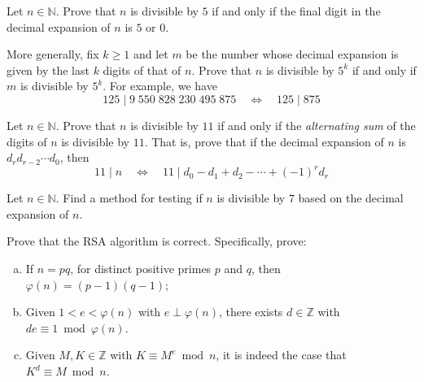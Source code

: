 \begin{exercise}
Let $n \in \mathbb{N}$. Prove that $n$ is divisible by $5$ if and only if the final digit in the decimal expansion of $n$ is $5$ or $0$.

More generally, fix $k \ge 1$ and let $m$ be the number whose decimal expansion is given by the last $k$ digits of that of $n$. Prove that $n$ is divisible by $5^k$ if and only if $m$ is divisible by $5^k$. For example, we have
\[ 125 \mid 9\;550\;828\;230\;495\;875 \quad \Leftrightarrow \quad 125 \mid 875 \]
\end{exercise}

\begin{exercise}
Let $n \in \mathbb{N}$. Prove that $n$ is divisible by $11$ if and only if the \textit{alternating sum} of the digits of $n$ is divisible by $11$. That is, prove that if the decimal expansion of $n$ is $d_rd_{r-2} \cdots d_0$, then
\[ 11 \mid n \quad \Leftrightarrow \quad 11 \mid d_0 - d_1 + d_2 - \cdots + (-1)^rd_r \]
\end{exercise}

\begin{exercise}
Let $n \in \mathbb{N}$. Find a method for testing if $n$ is divisible by $7$ based on the decimal expansion of $n$.
\end{exercise}


\begin{exercise}
Prove that the RSA algorithm is correct. Specifically, prove:
\begin{enumerate}[(a)]
\item If $n=pq$, for distinct positive primes $p$ and $q$, then $\varphi(n) = (p-1)(q-1)$;
\item Given $1<e<\varphi(n)$ with $e \perp \varphi(n)$, there exists $d \in \mathbb{Z}$ with $de \equiv 1 \bmod \varphi(n)$.
\item Given $M,K \in \mathbb{Z}$ with $K \equiv M^e \bmod n$, it is indeed the case that $K^d \equiv M \bmod n$.
\end{enumerate}
\end{exercise}
